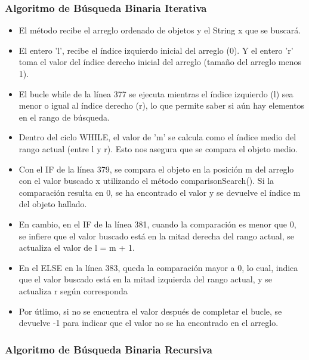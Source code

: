 \documentclass{article}
\begin{document}
    
    \subsubsection{Algoritmo de Búsqueda Binaria Iterativa}

    
        
        \begin{itemize}	
            \item El método recibe el arreglo ordenado de objetos y el String x que se buscará.
            \item El entero 'l',  recibe el índice izquierdo inicial del arreglo (0). Y el entero 'r' toma el valor del índice derecho inicial del arreglo (tamaño del arreglo menos 1).
            \item El bucle while de la línea 377 se ejecuta mientras el índice izquierdo (l) sea menor o igual al índice derecho (r), lo que permite saber si aún hay elementos en el rango de búsqueda.
            \item Dentro del ciclo WHILE, el valor de 'm' se calcula como el índice medio del rango actual (entre l y r). Esto nos asegura que se compara el objeto medio.
            \item Con el IF de la línea 379, se compara el objeto en la posición m del arreglo con el valor buscado x utilizando el método comparisonSearch(). Si la comparación resulta en 0, se ha encontrado el valor y se devuelve el índice m del objeto hallado.
            \item En cambio, en el IF de la línea 381, cuando la comparación es menor que 0, se infiere que el valor buscado está en la mitad derecha del rango actual, se actualiza el valor de l = m + 1.
            \item En el ELSE en la línea 383, queda la comparación mayor a 0, lo cual, indica que el valor buscado está en la mitad izquierda del rango actual, y se actualiza r según corresponda
            \item Por útlimo, si no se encuentra el valor después de completar el bucle, se devuelve -1 para indicar que el valor no se ha encontrado en el arreglo.
	\end{itemize}

 
    \subsubsection{Algoritmo de Búsqueda Binaria Recursiva}
\end{document}
